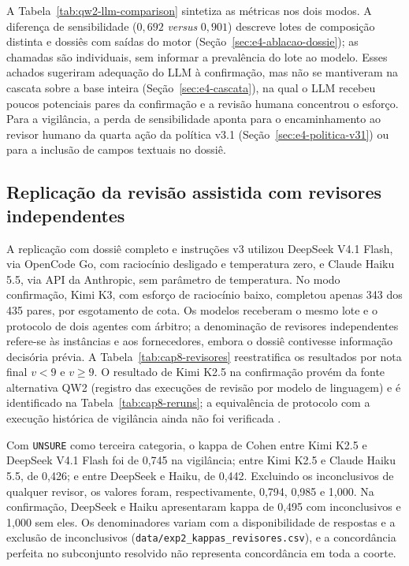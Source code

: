 A Tabela~\ref{tab:qw2-llm-comparison} sintetiza as métricas nos dois modos. A diferença de sensibilidade ($0{,}692$ \textit{versus} $0{,}901$) descreve lotes de composição distinta e dossiês com saídas do motor (Seção~\ref{sec:e4-ablacao-dossie}); as chamadas são individuais, sem informar a prevalência do lote ao modelo. Esses achados sugeriram adequação do LLM à confirmação, mas não se mantiveram na cascata sobre a base inteira (Seção~\ref{sec:e4-cascata}), na qual o LLM recebeu poucos potenciais pares da confirmação e a revisão humana concentrou o esforço. Para a vigilância, a perda de sensibilidade aponta para o encaminhamento ao revisor humano da quarta ação da política v3.1 (Seção~\ref{sec:e4-politica-v31}) ou para a inclusão de campos textuais no dossiê.

\subsection{Replicação da revisão assistida com revisores independentes}
\label{sec:e4-revisores}

A replicação com dossiê completo e instruções v3 utilizou DeepSeek V4.1 Flash, via OpenCode Go, com raciocínio desligado e temperatura zero, e Claude Haiku 5.5, via API da Anthropic, sem parâmetro de temperatura. No modo confirmação, Kimi K3, com esforço de raciocínio baixo, completou apenas 343 dos 435 pares, por esgotamento de cota. Os modelos receberam o mesmo lote e o protocolo de dois agentes com árbitro; a denominação de revisores independentes refere-se às instâncias e aos fornecedores, embora o dossiê contivesse informação decisória prévia. A Tabela~\ref{tab:cap8-revisores} reestratifica os resultados por nota final $v<9$ e $v\geq9$. O resultado de Kimi K2.5 na confirmação provém da fonte alternativa QW2 (registro das execuções de revisão por modelo de linguagem) e é identificado na Tabela~\ref{tab:cap8-reruns}; a equivalência de protocolo com a execução histórica de vigilância ainda não foi verificada \cite{Jardim2026phdrepo}.



Com \texttt{UNSURE} como terceira categoria, o kappa de Cohen \cite{McHugh2012kappa} entre Kimi K2.5 e DeepSeek V4.1 Flash foi de 0,745 na vigilância; entre Kimi K2.5 e Claude Haiku 5.5, de 0,426; e entre DeepSeek e Haiku, de 0,442. Excluindo os inconclusivos de qualquer revisor, os valores foram, respectivamente, 0,794, 0,985 e 1,000. Na confirmação, DeepSeek e Haiku apresentaram kappa de 0,495 com inconclusivos e 1,000 sem eles. Os denominadores variam com a disponibilidade de respostas e a exclusão de inconclusivos (\texttt{data/exp2\_kappas\_revisores.csv}), e a concordância perfeita no subconjunto resolvido não representa concordância em toda a coorte.

